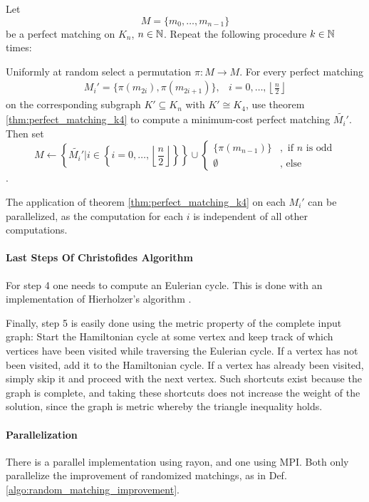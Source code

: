 \begin{definition}
  Let $$M = \{m_0,\dots, m_{n-1}\}$$ be a perfect matching on $K_n$, $n \in \mathbb{N}$.
  Repeat the following procedure $k \in \mathbb{N}$ times:

  Uniformly at random select a permutation $\pi: M \rightarrow M$.
  For every perfect matching
  \begin{align*}
    &M_i' = \{\pi(m_{2i}), \pi(m_{2i+1})\}, &i = 0,\dots, \left\lfloor{\frac{n}{2}}\right\rfloor&
  \end{align*}
  on the corresponding subgraph $K' \subseteq K_n$ with $K' \cong K_4$,
  use theorem \ref{thm:perfect_matching_k4} to compute a minimum-cost perfect matching $\widetilde{M_i'}$.
  Then set
  $$
  M \leftarrow \left\{\widetilde{M_i'} | i \in \left\{i = 0,\dots, \left\lfloor{\frac{n}{2}}\right\rfloor\right\}\right\}
    \cup \begin{cases} \{\pi(m_{n-1})\}&, \text{ if } n \text{ is odd} \\ \emptyset &,\text{ else}\end{cases}
  $$.
  \label{algo:random_matching_improvement}
\end{definition}
\begin{remark}
  The application of theorem \ref{thm:perfect_matching_k4} on each $M_i'$ can be parallelized,
  as the computation for each $i$ is independent of all other computations.
\end{remark}


\paragraph{Last Steps Of Christofides Algorithm}
For step 4 one needs to compute an Eulerian cycle. This is done with an implementation of
Hierholzer's algorithm \cite{hierholzer_ueber_1873}\cite[Algorithm X.4]{fleischner_algorithms_1991}.


Finally, step 5 is easily done using the metric property of the complete input graph: 
Start the Hamiltonian cycle at some vertex and keep track of which vertices have been visited
while traversing the Eulerian cycle.
If a vertex has not been visited, add it to the Hamiltonian cycle.
If a vertex has already been visited, simply skip it and proceed with the next vertex.
Such shortcuts exist because the graph is complete,
and taking these shortcuts does not increase the weight of the solution, since 
the graph is metric whereby the triangle inequality holds.

\paragraph{Parallelization}
\label{paragraph:christofides_mpi}
There is a parallel implementation using rayon, and one using \ac{MPI}.
Both only parallelize the improvement of randomized matchings, as in Def. \ref{algo:random_matching_improvement}.

